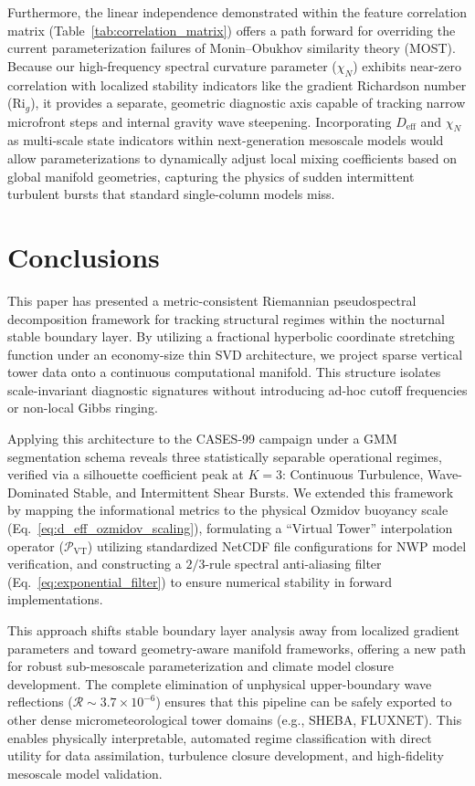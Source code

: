 \documentclass[11pt,a4paper]{article}
\begin{document}
Furthermore, the linear independence demonstrated within the feature correlation matrix (Table~\ref{tab:correlation_matrix}) offers a path forward for overriding the current parameterization failures of Monin--Obukhov similarity theory (MOST). Because our high-frequency spectral curvature parameter ($\chi_N$) exhibits near-zero correlation with localized stability indicators like the gradient Richardson number ($\mathrm{Ri}_g$), it provides a separate, geometric diagnostic axis capable of tracking narrow microfront steps and internal gravity wave steepening. Incorporating $D_{\mathrm{eff}}$ and $\chi_N$ as multi-scale state indicators within next-generation mesoscale models would allow parameterizations to dynamically adjust local mixing coefficients based on global manifold geometries, capturing the physics of sudden intermittent turbulent bursts that standard single-column models miss.

\section{Conclusions}
\label{sec:conclusions}

This paper has presented a metric-consistent Riemannian pseudospectral decomposition framework for tracking structural regimes within the nocturnal stable boundary layer. By utilizing a fractional hyperbolic coordinate stretching function under an economy-size thin SVD architecture, we project sparse vertical tower data onto a continuous computational manifold. This structure isolates scale-invariant diagnostic signatures without introducing ad-hoc cutoff frequencies or non-local Gibbs ringing.

Applying this architecture to the CASES-99 campaign under a GMM segmentation schema reveals three statistically separable operational regimes, verified via a silhouette coefficient peak at $K=3$: Continuous Turbulence, Wave-Dominated Stable, and Intermittent Shear Bursts. We extended this framework by mapping the informational metrics to the physical Ozmidov buoyancy scale (Eq.~\ref{eq:d_eff_ozmidov_scaling}), formulating a ``Virtual Tower'' interpolation operator ($\mathcal{P}_{\mathrm{VT}}$) utilizing standardized NetCDF file configurations for NWP model verification, and constructing a $2/3$-rule spectral anti-aliasing filter (Eq.~\ref{eq:exponential_filter}) to ensure numerical stability in forward implementations.

This approach shifts stable boundary layer analysis away from localized gradient parameters and toward geometry-aware manifold frameworks, offering a new path for robust sub-mesoscale parameterization and climate model closure development. The complete elimination of unphysical upper-boundary wave reflections ($\mathcal{R} \sim 3.7 \times 10^{-6}$) ensures that this pipeline can be safely exported to other dense micrometeorological tower domains (e.g., SHEBA, FLUXNET). This enables physically interpretable, automated regime classification with direct utility for data assimilation, turbulence closure development, and high-fidelity mesoscale model validation.
\end{document}
